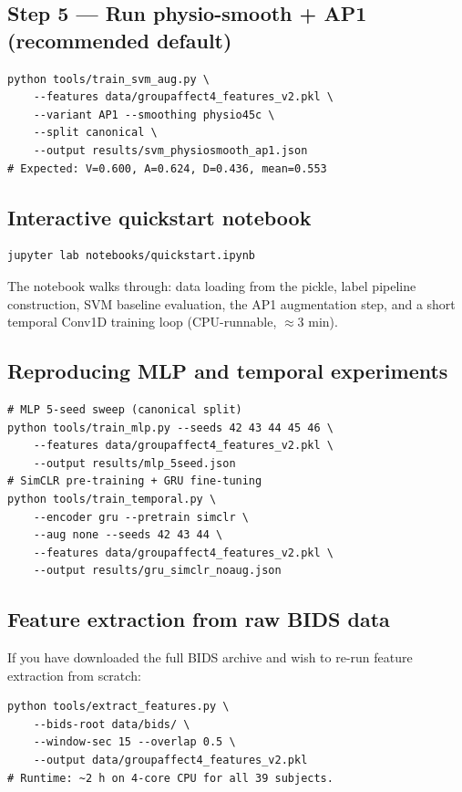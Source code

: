 \documentclass[sigconf,nonacm]{acmart}
\begin{document}
\subsection*{Step 5 — Run physio-smooth + AP1 (recommended default)}

\begin{lstlisting}
python tools/train_svm_aug.py \
    --features data/groupaffect4_features_v2.pkl \
    --variant AP1 --smoothing physio45c \
    --split canonical \
    --output results/svm_physiosmooth_ap1.json
# Expected: V=0.600, A=0.624, D=0.436, mean=0.553
\end{lstlisting}

\subsection*{Interactive quickstart notebook}

\begin{lstlisting}
jupyter lab notebooks/quickstart.ipynb
\end{lstlisting}

The notebook walks through:
data loading from the pickle, label pipeline construction,
SVM baseline evaluation, the AP1 augmentation step,
and a short temporal Conv1D training loop (CPU-runnable, ${\approx}$3 min).

\subsection*{Reproducing MLP and temporal experiments}

\begin{lstlisting}
# MLP 5-seed sweep (canonical split)
python tools/train_mlp.py --seeds 42 43 44 45 46 \
    --features data/groupaffect4_features_v2.pkl \
    --output results/mlp_5seed.json
# SimCLR pre-training + GRU fine-tuning
python tools/train_temporal.py \
    --encoder gru --pretrain simclr \
    --aug none --seeds 42 43 44 \
    --features data/groupaffect4_features_v2.pkl \
    --output results/gru_simclr_noaug.json
\end{lstlisting}

\subsection*{Feature extraction from raw BIDS data}

If you have downloaded the full BIDS archive and wish to re-run feature
extraction from scratch:

\begin{lstlisting}
python tools/extract_features.py \
    --bids-root data/bids/ \
    --window-sec 15 --overlap 0.5 \
    --output data/groupaffect4_features_v2.pkl
# Runtime: ~2 h on 4-core CPU for all 39 subjects.
\end{lstlisting}
\end{document}
